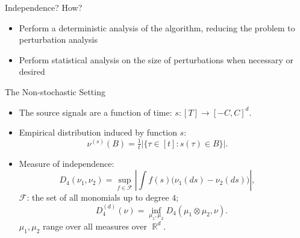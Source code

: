 \documentclass[final]{beamer} %
\DeclareMathOperator{\real}{\mathbb{R}}
\begin{document}
\begin{frame}[c]
\begin{columns}[t,totalwidth=\textwidth]
\begin{column}{.32\textwidth}
\begin{block}{Independence?}
			\centering \vspace{0.5ex}
				{\large How? }
				\vspace{0.5ex}
			\begin{itemize}
				\item Perform a deterministic analysis of the algorithm, reducing the problem to perturbation analysis
				\item Perform statistical analysis on the size of perturbations when necessary or desired
			\end{itemize}
		\end{block}
		\vspace{0.5ex}
		\begin{block}{The Non-stochastic Setting}
			\begin{itemize}
				\item The source signals are a function of time: $s:[T] \to [-C,C]^d$.
				\item Empirical distribution induced by function $s$:
				\[
					\nu^{(s)}(B)=\tfrac{1}{t}|\{\tau \in [t]: s(\tau) \in B\}|.
				\]
				\item Measure of independence:
					\[
					D_4(\nu_1,\nu_2)	= \sup_{f\in\mathcal{F}} \left|\int f(s) \big(\nu_1(ds) -\nu_2(ds)\big) \right|,
					\]
				 $\mathcal{F}$: the set of all monomials up to degree $4$; 
				  \[ \quad D_4^{(d)} (\nu)= \inf_{\mu_1,\mu_2} D_4(\mu_1\otimes \mu_2,\nu).
				  \]
				  $\mu_1, \mu_2$ range over all measures over $\real^d$.
			\end{itemize}
		\end{block}
		

	\end{column}
	\begin{column}{0.01\textwidth}
	\end{column}
	

\end{columns}
\end{frame}
\end{document}
